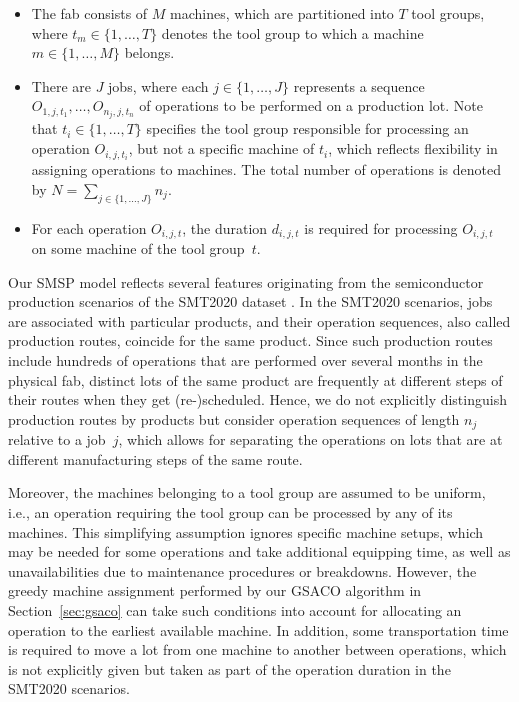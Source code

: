 \documentclass[runningheads]{llncs}
\begin{document}
\begin{itemize}
	\item The fab consists of $M$ machines, which are partitioned into $T$
	tool groups, where $t_m\in\{1,\dots,T\}$ denotes the tool group
	to which a machine $m\in\{1,\dots,M\}$ belongs.
	\item There are $J$ jobs, where each $j\in\{1,\dots,J\}$ represents a
	sequence $O_{1,j,t_1},\dots,O_{n_j,j,t_n}$ of operations to be performed on a production lot.
	Note that $t_i\in\{1,\dots,T\}$ specifies the tool group 
	responsible for processing an operation $O_{i,j,t_i}$, %
	but not a specific machine of $t_i$,
	which reflects flexibility in assigning operations to machines.
	The total number of operations is denoted by
	$N = \sum_{j\in\{1,\dots,J\}}n_j$.
	\item For each operation $O_{i,j,t}$,
	the duration $d_{i,j,t}$ is required for processing $O_{i,j,t}$
	on some machine of the tool group~$t$.
\end{itemize}

Our SMSP model reflects several features originating from the
semiconductor production scenarios of the SMT2020 dataset \cite{kopp2020smt2020}.
In the SMT2020 scenarios, jobs are associated with particular products, and
their operation sequences, also called production routes,
coincide for the same product.
Since such production routes include hundreds of operations
that are performed over several months in the physical fab,
distinct lots of the same product are frequently at different
steps of their routes when they get (re-)scheduled.
Hence, we do not explicitly distinguish production routes by products
but consider operation sequences of length $n_j$ relative to a job~$j$,
which allows for separating the operations on lots that are at
different manufacturing steps of the same route.

Moreover, the machines belonging to a tool group are assumed to be uniform,
i.e., an operation requiring the tool group can be processed by any of its
machines.
This simplifying assumption ignores specific machine setups, which may be
needed for some operations and take additional equipping time,
as well as unavailabilities due to maintenance procedures or breakdowns.
However, the greedy machine assignment performed by our GSACO algorithm
in Section~\ref{sec:gsaco} can take such conditions into account for
allocating an operation to the earliest available machine.
In addition, some transportation time is required to move
a lot from one machine to another between operations,
which is not explicitly given but taken as part of the operation duration
in the SMT2020 scenarios.
\end{document}
